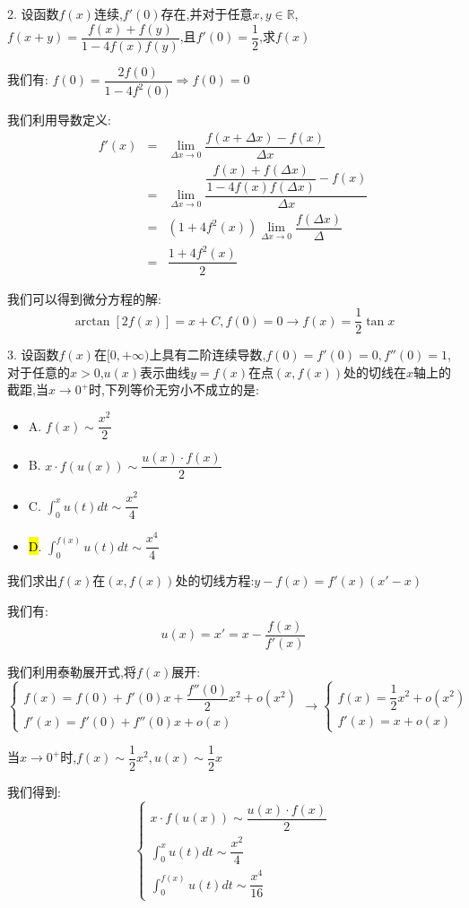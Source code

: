 2. 设函数$f(x)$连续,$f'(0)$存在,并对于任意$x,y\in\mathbb{R}$,$f(x+y)=\dfrac{f(x)+f(y)}{1-4f(x)f(y)}$,且$f'(0)=\dfrac{1}{2}$,求$f(x)$

\begin{solution}

	我们有:  $f(0)=\dfrac{2f(0)}{1-4f^2(0)}\Rightarrow f(0)=0$
	
	我们利用导数定义:  
	\begin{eqnarray*}
		f'(x)&=&\lim\limits_{\Delta x\rightarrow 0}\dfrac{f(x+\Delta x)-f(x)}{\Delta x}\\
		&=&\lim\limits_{\Delta x\rightarrow 0}\dfrac{\dfrac{f(x)+f(\Delta x)}{1-4f(x)f(\Delta x)}-f(x)}{\Delta x}\\
		&=&(1+4f^{2}(x))\lim\limits_{\Delta x\rightarrow 0}\dfrac{f(\Delta x)}{\Delta}\\
		&=&\dfrac{1+4f^{2}(x)}{2}
	\end{eqnarray*}
	
	我们可以得到微分方程的解:  
	$$\arctan[2f(x)]=x+C,f(0)=0\rightarrow f(x)=\dfrac{1}{2}\tan x$$
\end{solution}

3. 设函数$f(x)$在$[0,+\infty)$上具有二阶连续导数,$f(0)=f'(0)=0,f''(0)=1$,对于任意的$x>0$,$u(x)$表示曲线$y=f(x)$在点$(x,f(x))$处的切线在$x$轴上的截距,当$x\rightarrow 0^{+}$时,下列等价无穷小不成立的是:  
\begin{itemize}
	\item A. $f(x)\sim \dfrac{x^2}{2}$
	\item B. $x\cdot f(u(x))\sim \dfrac{u(x)\cdot f(x)}{2}$
	\item C. $\int_{0}^{x}u(t)dt\sim \dfrac{x^2}{4}$
	\item \hl{D}. $\int_{0}^{f(x)}u(t)dt\sim \dfrac{x^4}{4}$
\end{itemize}
\begin{solution}

	我们求出$f(x)$在$(x,f(x))$处的切线方程:$y-f(x)=f'(x)(x'-x)$
	
	我们有:
	$$u(x)=x'=x-\dfrac{f(x)}{f'(x)}$$
	
	我们利用泰勒展开式,将$f(x)$展开:
	$$\left\lbrace 
	\begin{array}{l}
		f(x)=f(0)+f'(0)x+\dfrac{f''(0)}{2}x^2+o(x^2)\\
		f'(x)=f'(0)+f''(0)x+o(x)
	\end{array}
	\right. \rightarrow \left\lbrace 
	\begin{array}{l}
		f(x)=\dfrac{1}{2}x^2+o(x^2)\\
		f'(x)=x+o(x)
	\end{array}
	\right. $$
	
	当$x\rightarrow 0^{+}$时,$f(x)\sim \dfrac{1}{2}x^2,u(x)\sim \dfrac{1}{2}x$
	
	我们得到:
	$$\left\lbrace 
	\begin{array}{l}
		x\cdot f(u(x))\sim \dfrac{u(x)\cdot f(x)}{2}\\
		\int_{0}^{x}u(t)dt\sim \dfrac{x^2}{4}\\
		\int_{0}^{f(x)}u(t)dt\sim \dfrac{x^4}{16}
	\end{array}
	\right. $$
\end{solution}

